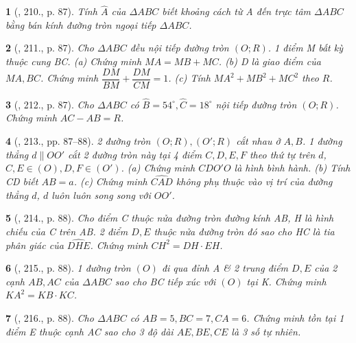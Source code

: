 \documentclass{article}
\newtheorem{baitoan}{}
\begin{document}
\begin{baitoan}[\cite{Binh_Toan_9_tap_2}, 210., p. 87]
	Tính $\widehat{A}$ của $\Delta ABC$ biết khoảng cách từ A đến trực tâm $\Delta ABC$ bằng bán kính đường tròn ngoại tiếp $\Delta ABC$.
\end{baitoan}

\begin{baitoan}[\cite{Binh_Toan_9_tap_2}, 211., p. 87]
	Cho $\Delta ABC$ đều nội tiếp đường tròn $(O;R)$. 1 điểm M bất kỳ thuộc cung BC. (a) Chứng minh $MA = MB + MC$. (b) D là giao điểm của $MA,BC$. Chứng minh $\dfrac{DM}{BM}  + \dfrac{DM}{CM} = 1$. (c) Tính $MA^2 + MB^2 + MC^2$ theo $R$.
\end{baitoan}

\begin{baitoan}[\cite{Binh_Toan_9_tap_2}, 212., p. 87]
	Cho $\Delta ABC$ có $\widehat{B} = 54^\circ,\widehat{C} = 18^\circ$ nội tiếp đường tròn $(O;R)$. Chứng minh $AC - AB = R$.
\end{baitoan}

\begin{baitoan}[\cite{Binh_Toan_9_tap_2}, 213., pp. 87--88]
	2 đường tròn $(O;R),(O';R)$ cắt nhau ở $A,B$. 1 đường thẳng $d\parallel OO'$ cắt 2 đường tròn này tại 4 điểm $C,D,E,F$ theo thứ tự trên $d$, $C,E\in(O),D,F\in(O')$. (a) Chứng minh $CDO'O$ là hình bình hành. (b) Tính CD biết $AB = a$. (c) Chứng minh $\widehat{CAD}$ không phụ thuộc vào vị trí của đường thẳng $d$, $d$ luôn luôn song song với $OO'$.
\end{baitoan}

\begin{baitoan}[\cite{Binh_Toan_9_tap_2}, 214., p. 88]
	Cho điểm C thuộc nửa đường tròn đường kính AB, H là hình chiếu của C trên AB. 2 điểm $D,E$ thuộc nửa đường tròn đó sao cho HC là tia phân giác của $\widehat{DHE}$. Chứng minh $CH^2 = DH\cdot EH$.
\end{baitoan}

\begin{baitoan}[\cite{Binh_Toan_9_tap_2}, 215., p. 88]
	1 đường tròn $(O)$ đi qua đỉnh A \& 2 trung điểm $D,E$ của 2 cạnh $AB,AC$ của $\Delta ABC$ sao cho BC tiếp xúc với $(O)$ tại K. Chứng minh $KA^2 = KB\cdot KC$.
\end{baitoan}

\begin{baitoan}[\cite{Binh_Toan_9_tap_2}, 216., p. 88]
	Cho $\Delta ABC$ có $AB = 5,BC = 7,CA = 6$. Chứng minh tồn tại 1 điểm E thuộc cạnh AC sao cho 3 độ dài $AE,BE,CE$ là 3 số tự nhiên.
\end{baitoan}
\end{document}
